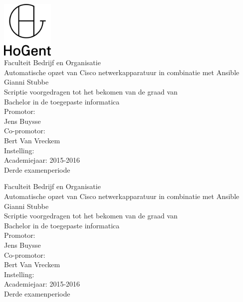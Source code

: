 \documentclass[pdftex,a4paper,12pt,twoside]{report}
\newcommand{\emptypage}{
\newpage
\thispagestyle{empty}
\mbox{}
\newpage
}
\newcommand{\student}{Gianni Stubbe}
\newcommand{\promotor}{Jens Buysse}
\newcommand{\copromotor}{Bert Van Vreckem}
\newcommand{\instelling}{}
\newcommand{\titel}{Automatische opzet van Cisco netwerkapparatuur in combinatie met Ansible}
\newcommand{\faculteit}{Faculteit Bedrijf en Organisatie}
\newcommand{\rapporttype}{Scriptie voorgedragen tot het bekomen van de graad van\\Bachelor in de toegepaste informatica}
\newcommand{\academiejaar}{2015-2016}
\newcommand{\examenperiode}{Derde examenperiode}
\begin{document}

\begin{titlepage}
  \begin{center}

    \begingroup
    \rmfamily
    \includegraphics[width=2.5cm]{img/HG-beeldmerk-woordmerk}\\[.5cm]
    \faculteit\\[3cm]
    \titel
    \vfill
    \student\\[3.5cm]
    \rapporttype\\[2cm]
    Promotor:\\
    \promotor\\
    Co-promotor:\\
    \copromotor\\[2.5cm]
    Instelling: \instelling\\[.5cm]
    Academiejaar: \academiejaar\\[.5cm]
    \examenperiode
    \endgroup

  \end{center}
  \restoregeometry
\end{titlepage}


\emptypage


\begin{titlepage}
  \begin{center}

    \begingroup
    \rmfamily
    \faculteit\\[3cm]
    \titel
    \vfill
    \student\\[3.5cm]
    \rapporttype\\[2cm]
    Promotor:\\
    \promotor\\
    Co-promotor:\\
    \copromotor\\[2.5cm]
    Instelling: \instelling\\[.5cm]
    Academiejaar: \academiejaar\\[.5cm]
    \examenperiode
    \endgroup

  \end{center}
  \restoregeometry
\end{titlepage}
\end{document}
